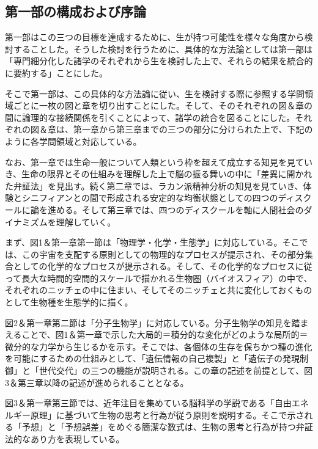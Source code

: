 \subsection{第一部の構成および序論}\label{ux7b2cux4e00ux90e8ux306eux69cbux6210ux304aux3088ux3073ux5e8fux8ad6}

第一部はこの三つの目標を達成するために、生が持つ可能性を様々な角度から検討することした。そうした検討を行うために、具体的な方法論としては第一部は「専門細分化した諸学のそれぞれから生を検討した上で、それらの結果を統合的に要約する」ことにした。

そこで第一部は、この具体的な方法論に従い、生を検討する際に参照する学問領域ごとに一枚の図と章を切り出すことにした。そして、そのそれぞれの図＆章の間に論理的な接続関係を引くことによって、諸学の統合を図ることにした。それぞれの図＆章は、第一章から第三章までの三つの部分に分けられた上で、下記のように各学問領域と対応している。

なお、第一章では生命一般について人類という枠を超えて成立する知見を見ていき、生命の限界とその仕組みを理解した上で脳の振る舞いの中に「差異に開かれた\mbox{弁証法}」を見出す。続く第二章では、ラカン派精神分析の知見を見ていき、体験とシニフィアンとの間で形成される安定的な均衡状態としての四つのディスクールに論を進める。そして第三章では、四つのディスクールを軸に人間社会のダイナミズムを理解していく。

まず、図1＆第一章第一節は「物理学・化学・生態学」に対応している。そこでは、この宇宙を支配する原則としての物理的なプロセスが提示され、その部分集合としての化学的なプロセスが提示される。そして、その化学的なプロセスに従って長大な時間的空間的スケールで描かれる生物圏（バイオスフィア）の中で、それぞれのニッチェの中に住まい、そしてそのニッチェと共に変化しておくものとして生物種を生態学的に描く。

図2＆第一章第二節は「分子生物学」に対応している。分子生物学の知見を踏まえることで、図1＆第一章で示した大局的＝積分的な変化がどのような局所的＝微分的な力学から生じるかを示す。そこでは、各個体の生存を保ちかつ種の進化を可能にするための仕組みとして、「遺伝情報の自己複製」と「遺伝子の発現制御」と「世代交代」の三つの機能が説明される。この章の記述を前提として、図3＆第三章以降の記述が進められることとなる。

図3＆第一章第三節では、近年注目を集めている脳科学の学説である「\mbox{自由エネルギー原理}」に基づいて生物の思考と行為が従う原則を説明する。そこで示される「予想」と「予想誤差」をめぐる簡潔な数式は、生物の思考と行為が持つ\mbox{弁証法}的なあり方を表現している。

